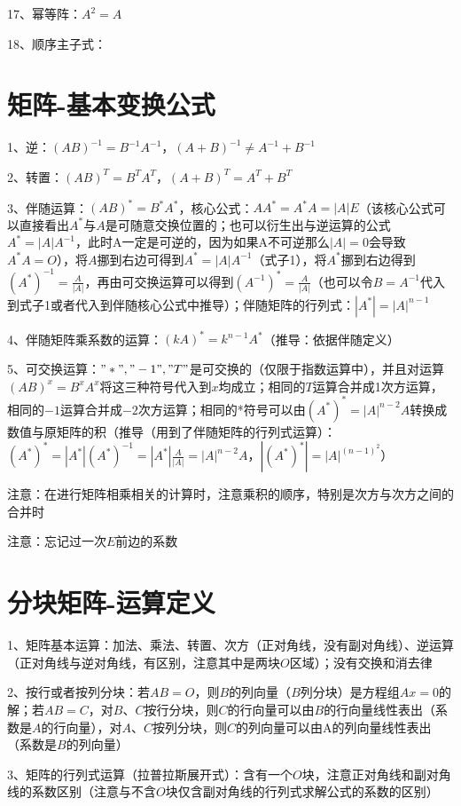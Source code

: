 17、幂等阵：$A^2=A$

18、顺序主子式：

\section{矩阵-基本变换公式}

1、逆：$(AB)^{-1}=B^{-1} A^{-1}$，$(A+B)^{-1}\ne A^{-1} + B^{-1}$

2、转置：$(AB)^T=B^TA^T$，$(A+B)^T=A^T + B^T$

3、伴随运算：$(AB)^*=B^*A^*$，核心公式：$AA^*=A^*A=|A|E$（该核心公式可以直接看出$A^*$与$A$是可随意交换位置的；也可以衍生出与逆运算的公式$A^*=|A|A^{-1}$，此时A一定是可逆的，因为如果A不可逆那么$|A|=0$会导致$A^*A=O$），将$A$挪到右边可得到$A^*=|A|A^{-1}$（式子1），将$A^*$挪到右边得到$(A^*)^{-1}=\frac{A}{|A|}$，再由可交换运算可以得到$(A^{-1})^*=\frac{A}{|A|}$（也可以令$B=A^{-1}$代入到式子1或者代入到伴随核心公式中推导）；伴随矩阵的行列式：$|A^*|=|A|^{n-1}$

4、伴随矩阵乘系数的运算：$(kA)^*=k^{n-1}A^*$（推导：依据伴随定义）

5、可交换运算：$"*","-1","T"$是可交换的（仅限于指数运算中），并且对运算$(AB)^x=B^xA^x$将这三种符号代入到$x$均成立；相同的$T$运算合并成1次方运算，相同的$-1$运算合并成$-2$次方运算；相同的*符号可以由$(A^*)^{*}=|A|^{n-2}A$转换成数值与原矩阵的积（推导（用到了伴随矩阵的行列式运算）：$(A^*)^{*}=|A^*|(A^*)^{-1}=|A^*|\frac{A}{|A|}=|A|^{n-2}A$，$|(A^*)^{*}|=|A|^{(n-1)^2}$）

注意：在进行矩阵相乘相关的计算时，注意乘积的顺序，特别是次方与次方之间的合并时

注意：忘记过一次$E$前边的系数

\section{分块矩阵-运算定义}

1、矩阵基本运算：加法、乘法、转置、次方（正对角线，没有副对角线）、逆运算（正对角线与逆对角线，有区别，注意其中是两块$O$区域）；没有交换和消去律

2、按行或者按列分块：若$AB=O$，则$B$的列向量（$B$列分块）是方程组$Ax=0$的解；若$AB=C$，对$B、C$按行分块，则$C$的行向量可以由$B$的行向量线性表出（系数是$A$的行向量），对$A、C$按列分块，则$C$的列向量可以由A的列向量线性表出（系数是$B$的列向量）

3、矩阵的行列式运算（拉普拉斯展开式）：含有一个$O$块，注意正对角线和副对角线的系数区别（注意与不含$O$块仅含副对角线的行列式求解公式的系数的区别）

